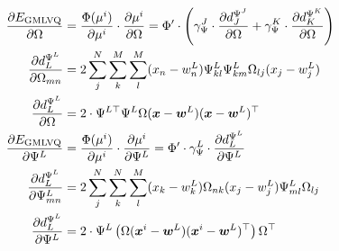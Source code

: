\begin{align}
\label{eq:derivative_LLiRaM_omega}
\frac{\partial E_{\mathrm{GMLVQ}}}{\partial\Omega} &= \frac{\Phi(\mu^i)}{\partial \mu^i}\cdot\frac{\partial \mu^i}{\partial \Omega} 
= \Phi^\prime\cdot\left( \gamma_\Psi^{J}\cdot\frac{\partial d_J^{\Psi^J}}{\partial\Omega} + 
\gamma_\Psi^{K}\cdot\frac{\partial d_K^{\Psi^K}}{\partial\Omega} \right) \\
\frac{\partial d_L^{\Psi^L}}{\partial\Omega_{mn}} &= 2\sum_j^N\sum^M_k\sum_l^M(x_n-w^L_n)\Psi^L_{kl}\Psi^L_{km}\Omega_{lj}(x_j-w^L_j) \\
\frac{\partial d_L^{\Psi^L}}{\partial\Omega} &= 2\cdot\Psi^{L\top}\Psi^L\Omega(\v{x}-\v{w}^L)(\v{x}-\v{w}^L)^\top\\
% 
\label{eq:derivative_LLiRaM_psi}
\frac{\partial E_{\mathrm{GMLVQ}}}{\partial\Psi^L} &= \frac{\Phi(\mu^i)}{\partial \mu^i}\cdot\frac{\partial \mu^i}{\partial\Psi^L} 
= \Phi^\prime\cdot\gamma^L_\Psi \cdot\frac{\partial d_L^{\Psi^L}}{\partial \Psi^L} \\
\frac{\partial d_L^{\Psi^L}}{\partial \Psi_{mn}^L} &= 2\sum_j^N\sum_k^N\sum_l^M(x_k-w^L_k)\Omega_{nk}(x_j-w_j^L)\Psi^L_{ml}\Omega_{lj} \\
\frac{\partial d_L^{\Psi^L}}{\partial \Psi^L} &= 2\cdot\Psi^L\left(\Omega(\v{x}^i-\v{w}^L)(\v{x}^i-\v{w}^L)^\top\right)\Omega^\top
\end{align}